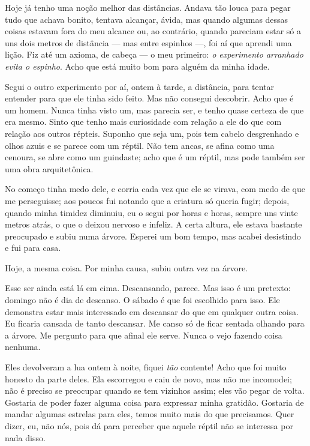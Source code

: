 Hoje já tenho uma noção melhor das distâncias. Andava tão louca para pegar
tudo que achava bonito, tentava alcançar, ávida, mas quando algumas
dessas coisas estavam fora do meu alcance ou, ao contrário, quando pareciam estar só a
uns dois metros de distância --- mas entre espinhos ---, foi aí que
aprendi uma lição. Fiz até um axioma, de cabeça --- o meu primeiro: \textit{o experimento
arranhado evita o espinho}. Acho que está muito bom para alguém da minha
idade.

Segui o outro experimento por aí, ontem à tarde, a distância, para tentar entender para que
ele tinha sido feito. Mas não consegui descobrir. Acho que é um
homem. Nunca tinha visto um, mas parecia ser, e tenho quase certeza de que
era mesmo. Sinto que tenho mais curiosidade com relação a ele do que
com relação aos outros répteis. Suponho que seja um, pois tem cabelo desgrenhado e
olhos azuis e se parece com um réptil. Não tem ancas, se afina como uma
cenoura, se abre como um guindaste; acho que é um réptil, mas
pode também ser uma obra arquitetônica.

No começo tinha medo dele, e corria cada vez que ele se virava, com medo de
que me perseguisse; aos poucos fui notando que a criatura só queria
fugir; depois, quando minha timidez diminuiu, eu o segui por horas e
horas, sempre uns vinte metros atrás, o que o deixou nervoso e infeliz.
A certa altura, ele estava bastante preocupado e subiu numa árvore. Esperei
um bom tempo, mas acabei desistindo e fui para casa.

Hoje, a mesma coisa. Por minha causa, subiu outra vez na árvore.

 Esse ser ainda está lá em cima. Descansando, parece. Mas isso é
um pretexto: domingo não é dia de descanso. O sábado é que foi escolhido
para isso. Ele demonstra estar mais interessado em
descansar do que em qualquer outra coisa. Eu ficaria cansada de tanto
descansar. Me canso só de ficar sentada olhando para a árvore. Me pergunto para
que afinal ele serve. Nunca o vejo fazendo coisa nenhuma.

Eles devolveram a lua ontem à noite, fiquei \textit{tão} contente! Acho que foi
muito honesto da parte deles. Ela escorregou e caiu de novo, mas não me
incomodei; não é preciso se preocupar quando se tem vizinhos
assim; eles vão pegar de volta. Gostaria de poder fazer alguma coisa para
expressar minha gratidão. Gostaria de mandar algumas estrelas para eles,
temos muito mais do que precisamos. Quer dizer, eu, não nós, pois dá para perceber que
aquele réptil não se interessa por nada disso.


